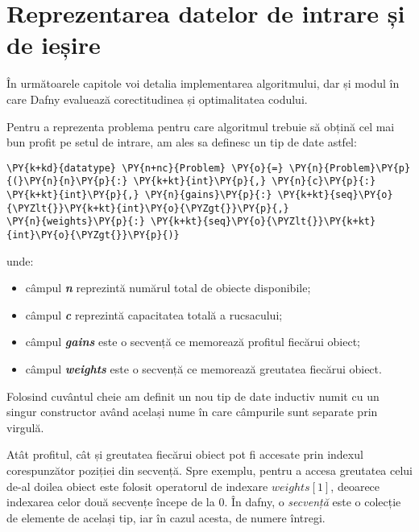 \lstset{style=mylststyle}
\begin{sloppypar}

\chapter{Reprezentarea datelor de intrare și de ieșire}

În următoarele capitole voi detalia implementarea algoritmului, dar și modul în care Dafny evaluează corectitudinea și optimalitatea codului. \par 
Pentru a reprezenta problema pentru care algoritmul trebuie să obțină cel mai bun profit pe setul de intrare, am ales sa definesc un tip de date  astfel:

\begin{Verbatim}[commandchars=\\\{\}]
\PY{k+kd}{datatype} \PY{n+nc}{Problem} \PY{o}{=} \PY{n}{Problem}\PY{p}{(}\PY{n}{n}\PY{p}{:} \PY{k+kt}{int}\PY{p}{,} \PY{n}{c}\PY{p}{:} \PY{k+kt}{int}\PY{p}{,} \PY{n}{gains}\PY{p}{:} \PY{k+kt}{seq}\PY{o}{\PYZlt{}}\PY{k+kt}{int}\PY{o}{\PYZgt{}}\PY{p}{,} 
\PY{n}{weights}\PY{p}{:} \PY{k+kt}{seq}\PY{o}{\PYZlt{}}\PY{k+kt}{int}\PY{o}{\PYZgt{}}\PY{p}{)} 
\end{Verbatim}
unde:
\begin{itemize}
    \item câmpul \textit{\textbf{\textcolor{coleight}{n}}} reprezintă numărul total de obiecte disponibile;
    \item câmpul \textit{\textbf{\textcolor{coleight}{c}}} reprezintă capacitatea totală a rucsacului;
    \item câmpul \textit{\textbf{\textcolor{coleight}{gains}}} este o secvență ce memorează profitul fiecărui obiect;
    \item câmpul \textit{\textbf{\textcolor{coleight}{weights}}} este o secvență ce memorează greutatea fiecărui obiect.
\end{itemize} \par
Folosind cuvântul cheie  am definit un nou tip de date inductiv numit  cu un singur constructor având același nume în care câmpurile sunt separate prin virgulă.
\par
Atât profitul, cât și greutatea fiecărui obiect pot fi accesate prin indexul corespunzător poziției din secvență. Spre exemplu, pentru a accesa greutatea celui de-al doilea obiect este folosit operatorul de indexare $weights[1]$, deoarece indexarea celor două secvențe începe de la 0. În dafny, o \textit{secvență} este o colecție de elemente de același tip, iar în cazul acesta, de numere întregi.  \par

\end{sloppypar}
